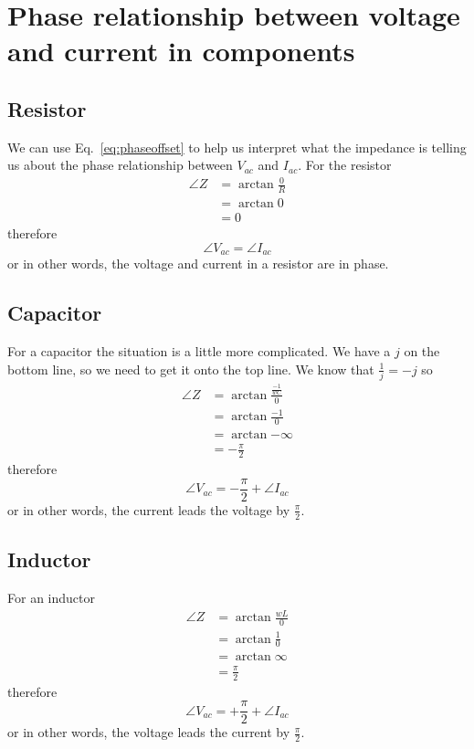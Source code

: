 \documentclass{tufte-handout}
\newcommand{\vac}{V_{ac}}%
\newcommand{\iac}{I_{ac}}%
\begin{document}
\section{Phase relationship between voltage and current in components}
\subsection{Resistor}
We can use Eq.~\ref{eq:phaseoffset} to help us interpret what the impedance is telling us about the phase relationship between $\vac$ and $\iac$. For the resistor
\begin{align}
\angle{Z} &= \arctan{\frac{0}{R}}\\
& = \arctan{0} \\
&= 0
\end{align}
therefore
\begin{equation}
\angle{\vac} = \angle{\iac}
\end{equation}
or in other words, the voltage and current in a resistor are in phase.

\subsection{Capacitor}
For a capacitor the situation is a little more complicated. We have a $j$ on the bottom line, so we need to get it onto the top line. 
We know\sidenote{
\[\frac{1}{j}\times\frac{j}{j} = \frac{j}{j^2} = \frac{j}{-1} = -j\]
} that $\frac{1}{j} = -j$ so 
\begin{align}
\angle{Z} & = \arctan{\frac{\frac{-1}{wC}}{0}}\\
& = \arctan{\frac{-1}{0}}\\
& = \arctan{-\infty}\\
& = -\frac{\pi}{2}
\end{align}
therefore
\begin{equation}
\angle{\vac} = -\frac{\pi}{2} + \angle{\iac}
\end{equation}
or in other words, the current leads the voltage by $\frac{\pi}{2}$. 

\noindent{}

\subsection{Inductor}
For an inductor 
\begin{align}
\angle{Z} & = \arctan{\frac{wL}{0}}\\
& = \arctan{\frac{1}{0}}\\
& = \arctan{\infty}\\
& = \frac{\pi}{2}
\end{align}
therefore
\begin{equation}
\angle{\vac} = +\frac{\pi}{2} + \angle{\iac}
\end{equation}
or in other words, the voltage leads the current by $\frac{\pi}{2}$. 
\end{document}
